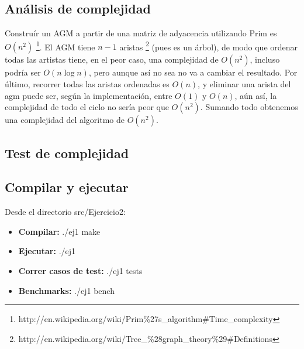 \subsection{An\'alisis de complejidad}
Construír un AGM a partir de una matriz de adyacencia utilizando Prim es $O(n^2)$ \footnote{http://en.wikipedia.org/wiki/Prim\%27s\_algorithm\#Time\_complexity}.
El AGM tiene $n-1$ aristas \footnote{http://en.wikipedia.org/wiki/Tree\_\%28graph\_theory\%29\#Definitions} (pues es un árbol), de modo que ordenar
todas las artistas tiene, en el peor caso, una complejidad de $O(n^2)$, incluso podría ser $O(n \log n)$, pero aunque así no sea no va a cambiar el resultado.
Por último, recorrer todas las aristas ordenadas es $O(n)$, y eliminar una arista del agm puede ser, según la implementación, entre $O(1)$ y $O(n)$, aún así, la complejidad de todo el ciclo no sería peor que $O(n^2)$. Sumando todo obtenemos una complejidad del algoritmo de $O(n^2)$.

\subsection{Test de complejidad}

\subsection{Compilar y ejecutar}
Desde el directorio src/Ejercicio2:
\begin{itemize}
   \item {\bf Compilar:} ./ej1 make
   \item {\bf Ejecutar:} ./ej1
   \item {\bf Correr casos de test:} ./ej1 tests
   \item {\bf Benchmarks:} ./ej1 bench
\end{itemize}
